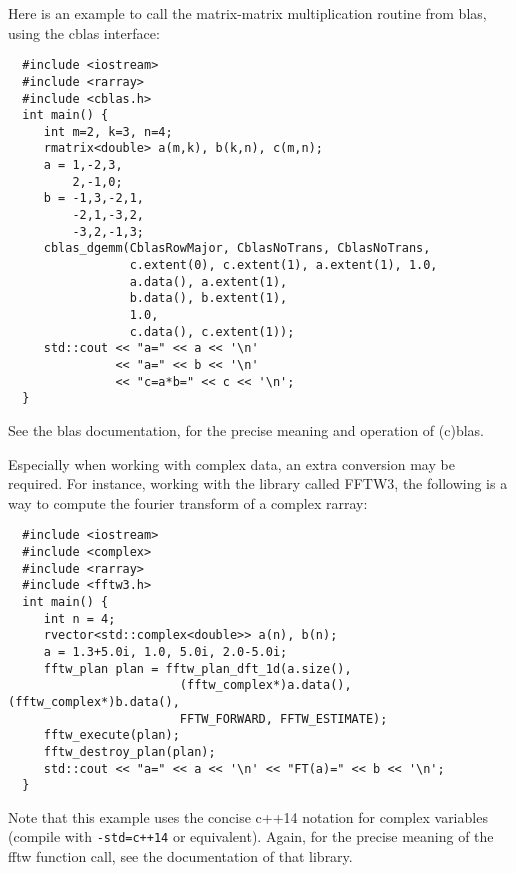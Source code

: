 \documentclass[11pt,twoside]{article}
\begin{document}
Here is an example to call the matrix-matrix multiplication routine
from blas, using the cblas interface:
\vspace{-5pt}\begin{framed}\vspace{-14pt}%
\begin{verbatim}
  #include <iostream>
  #include <rarray>
  #include <cblas.h>
  int main() {
     int m=2, k=3, n=4;
     rmatrix<double> a(m,k), b(k,n), c(m,n);
     a = 1,-2,3,
         2,-1,0;
     b = -1,3,-2,1,
         -2,1,-3,2,
         -3,2,-1,3;
     cblas_dgemm(CblasRowMajor, CblasNoTrans, CblasNoTrans,
                 c.extent(0), c.extent(1), a.extent(1), 1.0,
                 a.data(), a.extent(1),
                 b.data(), b.extent(1),
                 1.0,
                 c.data(), c.extent(1));
     std::cout << "a=" << a << '\n'
               << "a=" << b << '\n' 
               << "c=a*b=" << c << '\n';
  }
\end{verbatim}%
\vspace{-14pt}\end{framed}\vspace{-8pt}
\noindent
See the blas documentation, for the precise meaning and operation of
(c)blas.

Especially when working with complex data, an extra conversion may be
required. For instance, working with the library called FFTW3, the
following is a way to compute the fourier transform of a complex
rarray:
\vspace{-5pt}\begin{framed}\vspace{-14pt}%
\begin{verbatim}
  #include <iostream>
  #include <complex>
  #include <rarray>
  #include <fftw3.h>
  int main() {
     int n = 4;
     rvector<std::complex<double>> a(n), b(n);
     a = 1.3+5.0i, 1.0, 5.0i, 2.0-5.0i;
     fftw_plan plan = fftw_plan_dft_1d(a.size(),
                        (fftw_complex*)a.data(), (fftw_complex*)b.data(), 
                        FFTW_FORWARD, FFTW_ESTIMATE);
     fftw_execute(plan);
     fftw_destroy_plan(plan);
     std::cout << "a=" << a << '\n' << "FT(a)=" << b << '\n';
  }
\end{verbatim}%
\vspace{-14pt}\end{framed}\vspace{-8pt}
\noindent
Note that this example uses the concise c++14 notation for complex
variables (compile with \texttt{-std=c++14} or equivalent). Again, for the precise meaning of the fftw function call, see the documentation of
that library.
\end{document}
